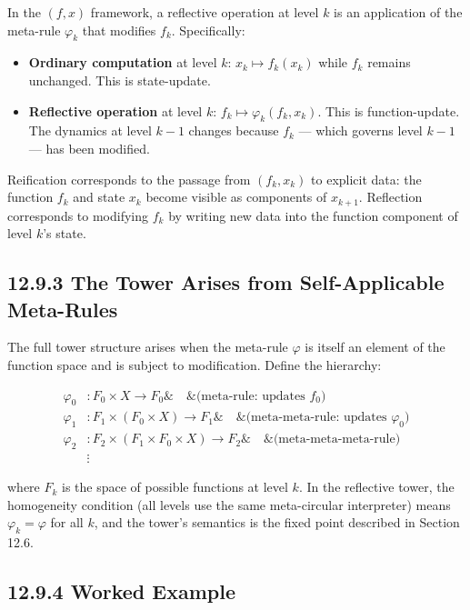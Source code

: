 In the $(f, x)$ framework, a reflective operation at level $k$ is an application of the meta-rule $\varphi_k$ that modifies $f_k$. Specifically:

\begin{itemize}
\item \textbf{Ordinary computation} at level $k$: $x_k \mapsto f_k(x_k)$ while $f_k$ remains unchanged. This is state-update.
\item \textbf{Reflective operation} at level $k$: $f_k \mapsto \varphi_k(f_k, x_k)$. This is function-update. The dynamics at level $k - 1$ changes because $f_k$ --- which governs level $k - 1$ --- has been modified.
\end{itemize}

Reification corresponds to the passage from $(f_k, x_k)$ to explicit data: the function $f_k$ and state $x_k$ become visible as components of $x_{k+1}$. Reflection corresponds to modifying $f_k$ by writing new data into the function component of level $k$'s state.

\subsection{12.9.3 The Tower Arises from Self-Applicable Meta-Rules}

The full tower structure arises when the meta-rule $\varphi$ is itself an element of the function space and is subject to modification. Define the hierarchy:

$$\begin{aligned}
\varphi_0 &: F_0 \times X \to F_0 \& \quad \& \text{(meta-rule: updates } f_0\text{)} \\
\varphi_1 &: F_1 \times (F_0 \times X) \to F_1 \& \quad \& \text{(meta-meta-rule: updates } \varphi_0\text{)} \\
\varphi_2 &: F_2 \times (F_1 \times F_0 \times X) \to F_2 \& \quad \& \text{(meta-meta-meta-rule)} \\
& \vdots
\end{aligned}$$

where $F_k$ is the space of possible functions at level $k$. In the reflective tower, the homogeneity condition (all levels use the same meta-circular interpreter) means $\varphi_k = \varphi$ for all $k$, and the tower's semantics is the fixed point described in Section 12.6.

\subsection{12.9.4 Worked Example}

